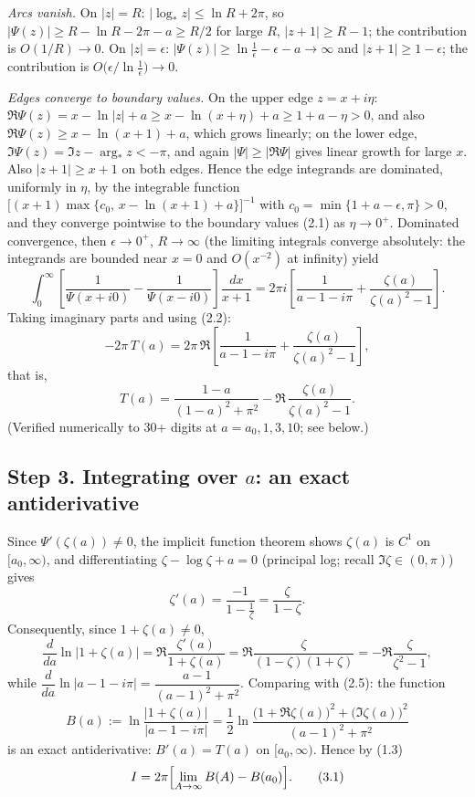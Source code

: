 \documentclass[11pt]{article}
\theoremstyle{remark}
\begin{document}
\textit{Arcs vanish.} On $|z|=R$: $|\log_* z|\le\ln R+2\pi$, so $|\Psi(z)|\ge R-\ln R-2\pi-a\ge R/2$ for large $R$, $|z+1|\ge R-1$; the contribution is $O(1/R)\to0$. On $|z|=\epsilon$: $|\Psi(z)|\ge\ln\frac1\epsilon-\epsilon-a\to\infty$ and $|z+1|\ge1-\epsilon$; the contribution is $O\!\bigl(\epsilon/\ln\frac1\epsilon\bigr)\to0$.

\textit{Edges converge to boundary values.} On the upper edge $z=x+i\eta$: $\Re\Psi(z)=x-\ln|z|+a\ge x-\ln(x+\eta)+a\ge 1+a-\eta>0$, and also $\Re \Psi(z) \ge x-\ln(x+1)+a$, which grows linearly; on the lower edge, $\Im\Psi(z)=\Im z-\arg_* z<-\pi$, and again $|\Psi|\ge|{\Re\Psi}|$ gives linear growth for large $x$. Also $|z+1|\ge x+1$ on both edges. Hence the edge integrands are dominated, uniformly in $\eta$, by the integrable function $\bigl[(x+1)\max\{c_0,\,x-\ln(x+1)+a\}\bigr]^{-1}$ with $c_0=\min\{1+a-\epsilon,\pi\}>0$, and they converge pointwise to the boundary values (2.1) as $\eta\to0^+$. Dominated convergence, then $\epsilon\to0^+$, $R\to\infty$ (the limiting integrals converge absolutely: the integrands are bounded near $x=0$ and $O(x^{-2})$ at infinity) yield
$$\int_0^\infty\left[\frac{1}{\Psi(x+i0)}-\frac{1}{\Psi(x-i0)}\right]\frac{dx}{x+1}
=2\pi i\left[\frac{1}{a-1-i\pi}+\frac{\zeta(a)}{\zeta(a)^{2}-1}\right].$$
Taking imaginary parts and using (2.2):
$$-2\pi\,T(a)=2\pi\,\Re\!\left[\frac{1}{a-1-i\pi}+\frac{\zeta(a)}{\zeta(a)^{2}-1}\right],$$
that is,
\begin{equation*}
T(a)=\frac{1-a}{(1-a)^{2}+\pi^{2}}-\Re\,\frac{\zeta(a)}{\zeta(a)^{2}-1}. \tag{2.5}
\end{equation*}
(Verified numerically to 30+ digits at $a=a_0,1,3,10$; see below.)

\subsection*{Step 3. Integrating over $a$: an exact antiderivative}

Since $\Psi'(\zeta(a))\neq0$, the implicit function theorem shows $\zeta(a)$ is $C^1$ on $[a_0,\infty)$, and differentiating $\zeta-\log\zeta+a=0$ (principal log; recall $\Im\zeta\in(0,\pi)$) gives
$$\zeta'(a)=\frac{-1}{1-\frac{1}{\zeta}}=\frac{\zeta}{1-\zeta}.$$
Consequently, since $1+\zeta(a)\ne 0$,
$$\frac{d}{da}\ln\bigl|1+\zeta(a)\bigr|=\Re\frac{\zeta'(a)}{1+\zeta(a)}
=\Re\frac{\zeta}{(1-\zeta)(1+\zeta)}=-\Re\frac{\zeta}{\zeta^{2}-1},$$
while $\dfrac{d}{da}\ln|a-1-i\pi|=\dfrac{a-1}{(a-1)^{2}+\pi^{2}}$. Comparing with (2.5): the function
$$B(a):=\ln\frac{\bigl|1+\zeta(a)\bigr|}{\bigl|a-1-i\pi\bigr|}
=\frac12\ln\frac{\bigl(1+\Re\zeta(a)\bigr)^{2}+\bigl(\Im\zeta(a)\bigr)^{2}}{(a-1)^{2}+\pi^{2}}$$
is an exact antiderivative: $B'(a)=T(a)$ on $[a_0,\infty)$. Hence by (1.3)
\begin{equation*}
I=2\pi\Bigl[\lim_{A\to\infty}B(A)-B(a_0)\Bigr]. \tag{3.1}
\end{equation*}
\end{document}
